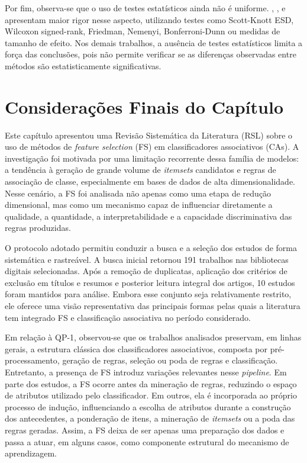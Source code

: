 Por fim, observa-se que o uso de testes estatísticos ainda não é uniforme. , ,  e  apresentam maior rigor nesse aspecto, utilizando testes como Scott-Knott ESD, Wilcoxon signed-rank, Friedman, Nemenyi, Bonferroni-Dunn ou medidas de tamanho de efeito. Nos demais trabalhos, a ausência de testes estatísticos limita a força das conclusões, pois não permite verificar se as diferenças observadas entre métodos são estatisticamente significativas.


\section{Considerações Finais do Capítulo}
\label{sec:consideracoes_finais_trabrelac}

Este capítulo apresentou uma Revisão Sistemática da Literatura (RSL) sobre o uso de métodos de \textit{feature selection} (FS) em classificadores associativos (CAs). A investigação foi motivada por uma limitação recorrente dessa família de modelos: a tendência à geração de grande volume de \textit{itemsets} candidatos e regras de associação de classe, especialmente em bases de dados de alta dimensionalidade. Nesse cenário, a FS foi analisada não apenas como uma etapa de redução dimensional, mas como um mecanismo capaz de influenciar diretamente a qualidade, a quantidade, a interpretabilidade e a capacidade discriminativa das regras produzidas.

O protocolo adotado permitiu conduzir a busca e a seleção dos estudos de forma sistemática e rastreável. A busca inicial retornou 191 trabalhos nas bibliotecas digitais selecionadas. Após a remoção de duplicatas, aplicação dos critérios de exclusão em títulos e resumos e posterior leitura integral dos artigos, 10 estudos foram mantidos para análise. Embora esse conjunto seja relativamente restrito, ele oferece uma visão representativa das principais formas pelas quais a literatura tem integrado FS e classificação associativa no período considerado.

Em relação à QP-1, observou-se que os trabalhos analisados preservam, em linhas gerais, a estrutura clássica dos classificadores associativos, composta por pré-processamento, geração de regras, seleção ou poda de regras e classificação. Entretanto, a presença de FS introduz variações relevantes nesse \textit{pipeline}. Em parte dos estudos, a FS ocorre antes da mineração de regras, reduzindo o espaço de atributos utilizado pelo classificador. Em outros, ela é incorporada ao próprio processo de indução, influenciando a escolha de atributos durante a construção dos antecedentes, a ponderação de itens, a mineração de \textit{itemsets} ou a poda das regras geradas. Assim, a FS deixa de ser apenas uma preparação dos dados e passa a atuar, em alguns casos, como componente estrutural do mecanismo de aprendizagem.

